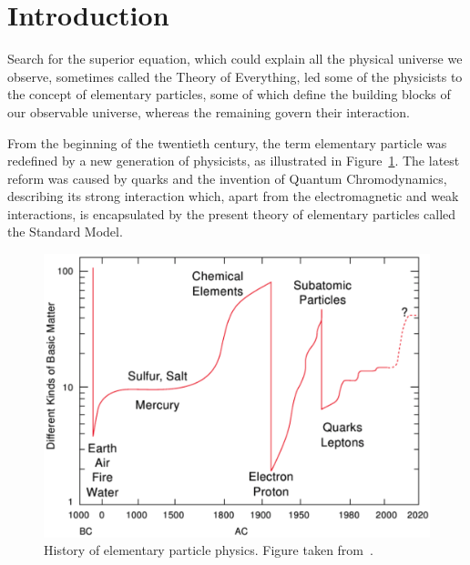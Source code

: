 \documentclass[a4paper,11pt,twoside,openright]{book}
\begin{document}
\clearpage
{}
\listoftables

\clearpage
{}
\listoffigures

\cleardoublepage

\clearpage
{}
\setcounter{page}{1}

\chapter*{Introduction}

Search for the superior equation, which could explain all the physical universe
we observe, sometimes called the Theory of Everything, led some of the
physicists to the concept of elementary particles, some of which define the
building blocks of our observable universe, whereas the remaining govern their
interaction.

From the beginning of the twentieth century, the term elementary particle
was redefined by a new generation of physicists, as illustrated in
Figure~\ref{fig:HistoryOfElPartPhysics}. The latest reform was caused by quarks
and the invention of Quantum Chromodynamics, describing its strong interaction
which, apart from the electromagnetic and weak interactions, is encapsulated
by the present theory of elementary particles called the Standard Model. 

\begin{figure}[t]
  \centering
  \includegraphics[width=\textwidth]{Introduction/HistoryOfElementaryParticlePhysics.png}
  \caption[History of elementary particle physics.]{History of elementary
    particle physics. Figure taken from~\cite{LatticeQCDForPedestrians}.}
  \label{fig:HistoryOfElPartPhysics}
\end{figure}
\end{document}

